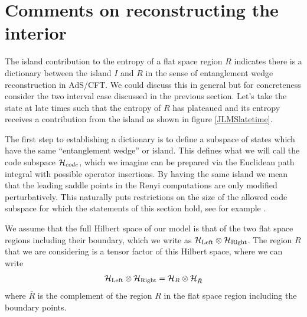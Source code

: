 

\section{Comments on reconstructing the interior}
\label{sec:Dictionary}

The island contribution to the entropy of a flat space region $R$ indicates there is a dictionary between the island $I$ and $R$ in the sense of entanglement wedge reconstruction in AdS/CFT. We could discuss this in general but for concreteness consider the two interval case discussed in the previous section. Let's take the state at late times such that the entropy of $R$ has plateaued and its entropy receives a contribution from the island as shown in figure \ref{JLMSlatetime}.

The first step to establishing a dictionary is to define a subspace of states which have the same ``entanglement wedge'' or island. This defines what we will call the code subspace  ${\cal H}_{code}$, which we imagine can be prepared via the Euclidean path integral with possible operator insertions. By having the same island we mean that the leading saddle points in the Renyi computations are only modified perturbatively. This naturally puts restrictions on the size of the allowed code subspace for which the statements of this section hold, see for example \cite{Hayden:2018khn, hayden2017approximate}. 


We assume that the full Hilbert space of our model is that of the two flat space regions including their boundary, which we write as $ {\cal H}_{\rm Left} \otimes {\cal H}_{\rm Right}$. The region $R$ that we are considering is a tensor factor of this Hilbert space, where we can write
\begin{align}
 {\cal H}_{\rm Left} \otimes {\cal H}_{\rm Right} = {\cal H}_R \otimes {\cal H}_{\bar R}
\end{align}
where $\bar{R}$ is the complement of the region $R$ in the flat space region including the boundary points. 

